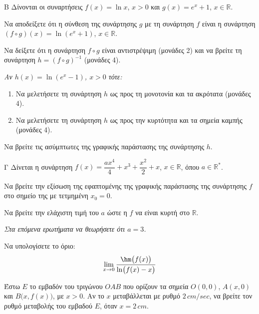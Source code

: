 \begin{thema}{Β}
Δίνονται οι συναρτήσεις $f(x) = \ln x$, $x > 0$ και $g(x) = e^x + 1$, $x \in \mathbb{R}$.
\begin{erwthma}
    \item Να αποδείξετε ότι η σύνθεση της συνάρτησης $g$ με τη συνάρτηση $f$ είναι η συνάρτηση $(f \circ g)(x) = \ln(e^x + 1)$, $x \in \mathbb{R}$. 

    \item Να δείξετε ότι η συνάρτηση $f \circ g$ είναι αντιστρέψιμη (μονάδες 2) και να βρείτε τη συνάρτηση $h = (f \circ g)^{-1}$ (μονάδες 4). 

    \item[\phantom{Β0.}] \textit{Αν $h(x) = \ln(e^x - 1)$, $x > 0$ τότε:}

    \item
    \begin{enumerate}[label=\roman*)]
        \item Να μελετήσετε τη συνάρτηση $h$ ως προς τη μονοτονία και τα ακρότατα (μονάδες 4).
        \item Να μελετήσετε τη συνάρτηση $h$ ως προς την κυρτότητα και τα σημεία καμπής (μονάδες 4).
    \end{enumerate}

    \item Να βρείτε τις ασύμπτωτες της γραφικής παράστασης της συνάρτησης $h$. 
\end{erwthma}
\end{thema}

\begin{thema}{Γ}
Δίνεται η συνάρτηση $f(x) = \dfrac{a x^4}{4} + x^3 + \dfrac{x^2}{2} + x$, $x \in \mathbb{R}$, όπου $a \in \mathbb{R}^*$.
\begin{erwthma}
    \item Να βρείτε την εξίσωση της εφαπτομένης της γραφικής παράστασης της συνάρτησης $f$ στο σημείο της με τετμημένη $x_0 = 0$. 

    \item Να βρείτε την ελάχιστη τιμή του $a$ ώστε η $f$ να είναι κυρτή στο $\mathbb{R}$. 

    \item[\phantom{Γ0.}] \textit{Στα επόμενα ερωτήματα να θεωρήσετε ότι $a = 3$.}

    \item Να υπολογίσετε το όριο:
    \[
    \lim_{x \to 0} \frac{\hm\bigl(f(x)\bigr)}{\ln\bigl(f(x) - x\bigr)}
    \]

    \item Έστω $E$ το εμβαδόν του τριγώνου ${OAB}$ που ορίζουν τα σημεία $O(0,0)$, $A(x, 0)$ και $B\bigl(x, f(x)\bigr)$, με $x > 0$. Αν το $x$ μεταβάλλεται με ρυθμό $2\,\si{cm/sec}$, να βρείτε τον ρυθμό μεταβολής του εμβαδού $E$, όταν $x = 2\,\si{cm}$. 
\end{erwthma}
\end{thema}

